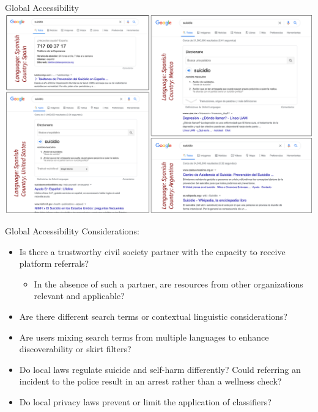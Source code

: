 \documentclass[nobackground,dvipsnames,table,aspectratio=169]{beamer}
\begin{document}
\begin{frame}{Global Accessibility}
    \centering
    \includegraphics[width=\textwidth]{global-accessibility}
\end{frame}

\begin{frame}{Global Accessibility}
    Considerations:
    \begin{itemize}
        \item Is there a trustworthy civil society partner with the capacity to receive platform referrals?
        \begin{itemize}
            \item In the absence of such a partner, are resources from other organizations relevant and applicable?
        \end{itemize}
        \item Are there different search terms or contextual linguistic considerations?
        \item Are users mixing search terms from multiple languages to enhance discoverability or skirt filters?
        \item Do local laws regulate suicide and self-harm differently? Could referring an incident to the police result in an arrest rather than a wellness check?
        \item Do local privacy laws prevent or limit the application of classifiers?
    \end{itemize}
\end{frame}
\end{document}
